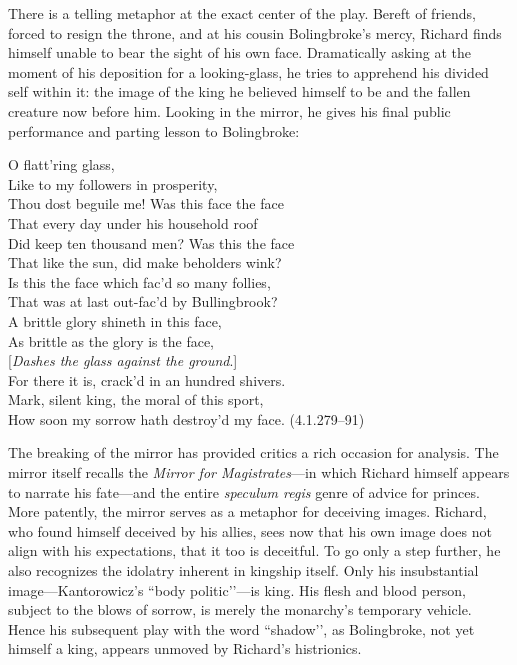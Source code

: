 There is a telling metaphor at the exact center of the play.
Bereft of friends, forced to resign the throne, and at his cousin Bolingbroke’s mercy, Richard finds himself unable to bear the sight of his own face.
Dramatically asking at the moment of his deposition for a looking-glass, he tries to apprehend his divided self within it: the image of the king he believed himself to be and the fallen creature now before him.
Looking in the mirror, he gives his final public performance and parting lesson to Bolingbroke:
\begin{vq}
O flatt’ring glass, \\
Like to my followers in prosperity, \\
Thou dost beguile me! Was this face the face \\
That every day under his household roof \\
Did keep ten thousand men? Was this the face \\
That like the sun, did make beholders wink? \\
Is this the face which fac’d so many follies, \\
That was at last out-fac’d by Bullingbrook? \\
A brittle glory shineth in this face, \\
As brittle as the glory is the face, \\
\hspace{9em} [\emph{Dashes the glass against the ground}.] \\
For there it is, crack’d in an hundred shivers. \\
Mark, silent king, the moral of this sport, \\
How soon my sorrow hath destroy’d my face. (4.1.279--91)
\end{vq}
The breaking of the mirror has provided critics a rich occasion for analysis.
The mirror itself recalls the \emph{Mirror for Magistrates}---in which Richard himself appears to narrate his fate---and the entire \emph{speculum regis} genre of advice for princes.
More patently, the mirror serves as a metaphor for deceiving images.
Richard, who found himself deceived by his allies, sees now that his own image does not align with his expectations, that it too is deceitful.
To go only a step further, he also recognizes the idolatry inherent in kingship itself.
Only his insubstantial image---Kantorowicz’s ``body politic’’---is king.
His flesh and blood person, subject to the blows of sorrow, is merely the monarchy’s temporary vehicle.
Hence his subsequent play with the word ``shadow’’, as Bolingbroke, not yet himself a king, appears unmoved by Richard’s histrionics.
